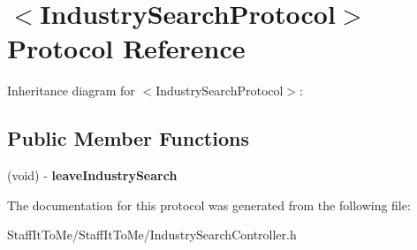 \hypertarget{protocol_industry_search_protocol-p}{
\section{$<$\-Industry\-Search\-Protocol$>$ \-Protocol \-Reference}
\label{protocol_industry_search_protocol-p}
}


\-Inheritance diagram for $<$\-Industry\-Search\-Protocol$>$\-:
\subsection*{\-Public \-Member \-Functions}
\begin{DoxyCompactItemize}
\item 
\hypertarget{protocol_industry_search_protocol-p_a91ba4bef4ab629574dfaec20bccc5463}{
(void) -\/ {\bfseries leave\-Industry\-Search}}
\label{protocol_industry_search_protocol-p_a91ba4bef4ab629574dfaec20bccc5463}

\end{DoxyCompactItemize}


\-The documentation for this protocol was generated from the following file\-:\begin{DoxyCompactItemize}
\item 
\-Staff\-It\-To\-Me/\-Staff\-It\-To\-Me/\-Industry\-Search\-Controller.\-h\end{DoxyCompactItemize}
